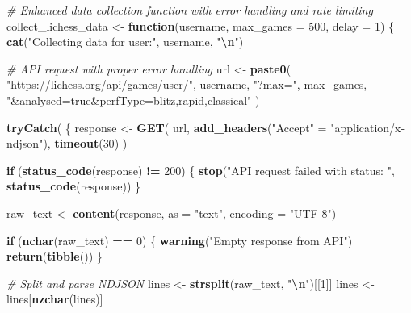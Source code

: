 \documentclass[
]{article}
\newenvironment{Shaded}{\begin{snugshade}}{\end{snugshade}}
\newcommand{\AttributeTok}[1]{\textcolor[rgb]{0.13,0.29,0.53}{#1}}
\newcommand{\CommentTok}[1]{\textcolor[rgb]{0.56,0.35,0.01}{\textit{#1}}}
\newcommand{\ControlFlowTok}[1]{\textcolor[rgb]{0.13,0.29,0.53}{\textbf{#1}}}
\newcommand{\DecValTok}[1]{\textcolor[rgb]{0.00,0.00,0.81}{#1}}
\newcommand{\FunctionTok}[1]{\textcolor[rgb]{0.13,0.29,0.53}{\textbf{#1}}}
\newcommand{\NormalTok}[1]{#1}
\newcommand{\OtherTok}[1]{\textcolor[rgb]{0.56,0.35,0.01}{#1}}
\newcommand{\SpecialCharTok}[1]{\textcolor[rgb]{0.81,0.36,0.00}{\textbf{#1}}}
\newcommand{\StringTok}[1]{\textcolor[rgb]{0.31,0.60,0.02}{#1}}
\begin{document}
\begin{Shaded}
\begin{Highlighting}[]
\CommentTok{\# Enhanced data collection function with error handling and rate limiting}
\NormalTok{collect\_lichess\_data }\OtherTok{\textless{}{-}} \ControlFlowTok{function}\NormalTok{(username, }\AttributeTok{max\_games =} \DecValTok{500}\NormalTok{, }\AttributeTok{delay =} \DecValTok{1}\NormalTok{) \{}
  \FunctionTok{cat}\NormalTok{(}\StringTok{"Collecting data for user:"}\NormalTok{, username, }\StringTok{"}\SpecialCharTok{\textbackslash{}n}\StringTok{"}\NormalTok{)}

  \CommentTok{\# API request with proper error handling}
\NormalTok{  url }\OtherTok{\textless{}{-}} \FunctionTok{paste0}\NormalTok{(}
    \StringTok{"https://lichess.org/api/games/user/"}\NormalTok{, username,}
    \StringTok{"?max="}\NormalTok{, max\_games, }\StringTok{"\&analysed=true\&perfType=blitz,rapid,classical"}
\NormalTok{  )}

  \FunctionTok{tryCatch}\NormalTok{(}
\NormalTok{    \{}
\NormalTok{      response }\OtherTok{\textless{}{-}} \FunctionTok{GET}\NormalTok{(}
\NormalTok{        url,}
        \FunctionTok{add\_headers}\NormalTok{(}\StringTok{"Accept"} \OtherTok{=} \StringTok{"application/x{-}ndjson"}\NormalTok{),}
        \FunctionTok{timeout}\NormalTok{(}\DecValTok{30}\NormalTok{)}
\NormalTok{      )}

      \ControlFlowTok{if}\NormalTok{ (}\FunctionTok{status\_code}\NormalTok{(response) }\SpecialCharTok{!=} \DecValTok{200}\NormalTok{) \{}
        \FunctionTok{stop}\NormalTok{(}\StringTok{"API request failed with status: "}\NormalTok{, }\FunctionTok{status\_code}\NormalTok{(response))}
\NormalTok{      \}}

\NormalTok{      raw\_text }\OtherTok{\textless{}{-}} \FunctionTok{content}\NormalTok{(response, }\AttributeTok{as =} \StringTok{"text"}\NormalTok{, }\AttributeTok{encoding =} \StringTok{"UTF{-}8"}\NormalTok{)}

      \ControlFlowTok{if}\NormalTok{ (}\FunctionTok{nchar}\NormalTok{(raw\_text) }\SpecialCharTok{==} \DecValTok{0}\NormalTok{) \{}
        \FunctionTok{warning}\NormalTok{(}\StringTok{"Empty response from API"}\NormalTok{)}
        \FunctionTok{return}\NormalTok{(}\FunctionTok{tibble}\NormalTok{())}
\NormalTok{      \}}

      \CommentTok{\# Split and parse NDJSON}
\NormalTok{      lines }\OtherTok{\textless{}{-}} \FunctionTok{strsplit}\NormalTok{(raw\_text, }\StringTok{"}\SpecialCharTok{\textbackslash{}n}\StringTok{"}\NormalTok{)[[}\DecValTok{1}\NormalTok{]]}
\NormalTok{      lines }\OtherTok{\textless{}{-}}\NormalTok{ lines[}\FunctionTok{nzchar}\NormalTok{(lines)]}


\end{Highlighting}
\end{Shaded}
\end{document}
